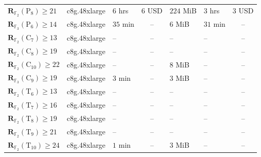 \documentclass[11pt]{article}
\theoremstyle{definition}
\newcommand{\F}{\mathbb{F}}
\newcommand{\Rk}[2]{\mathbf{R}_{#1}(#2)}
\newcommand{\Cyct}[1]{\mathrm{C}_{#1}}
\newcommand{\Fullt}[1]{\mathrm{P}_{#1}}
\newcommand{\Trunct}[1]{\mathrm{T}_{#1}}
\begin{document}
\begin{table}[!ht]
\begin{tabular}{lllcllc}
    $\Rk{\F_2}{\Fullt{8}}\ge 21$              & c8g.48xlarge             & $6$ hrs                   & $6$ USD                   & $224$ MiB                & $3$ hrs                   & $3$ USD                   \\
    $\Rk{\F_3}{\Fullt{6}}\ge 14$              & c8g.48xlarge             & $35$ min                  & --                        & $6$ MiB                  & $31$ min                  & --                        \\
    \midrule
    $\Rk{\F_2}{\Cyct{7}}\ge 13$               & c8g.48xlarge             & --                        & --                        & --                       & --                        & --                        \\
    $\Rk{\F_2}{\Cyct{8}}\ge 19$               & c8g.48xlarge             & --                        & --                        & --                       & --                        & --                        \\
    $\Rk{\F_2}{\Cyct{10}}\ge 22$              & c8g.48xlarge             & --                        & --                        & $8$ MiB                  & --                        & --                        \\
    $\Rk{\F_3}{\Cyct{9}}\ge 19$               & c8g.48xlarge             & $3$ min                   & --                        & $3$ MiB                  & --                        & --                        \\
    \midrule
    $\Rk{\F_2}{\Trunct{6}}\ge 13$             & c8g.48xlarge             & --                        & --                        & --                       & --                        & --                        \\
    $\Rk{\F_2}{\Trunct{7}}\ge 16$             & c8g.48xlarge             & --                        & --                        & --                       & --                        & --                        \\
    $\Rk{\F_2}{\Trunct{8}}\ge 19$             & c8g.48xlarge             & --                        & --                        & --                       & --                        & --                        \\
    $\Rk{\F_2}{\Trunct{9}}\ge 21$             & c8g.48xlarge             & --                        & --                        & --                       & --                        & --                        \\
    $\Rk{\F_2}{\Trunct{10}}\ge 24$            & c8g.48xlarge             & $1$ min                   & --                        & $3$ MiB                  & --                        & --                        \\

\end{tabular}
\end{table}
\end{document}
